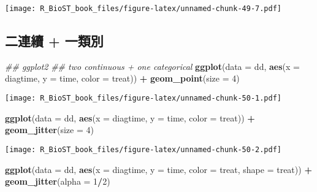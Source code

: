 \documentclass[
]{book}
\newenvironment{Shaded}{\begin{snugshade}}{\end{snugshade}}
\newcommand{\CommentTok}[1]{\textcolor[rgb]{0.56,0.35,0.01}{\textit{#1}}}
\newcommand{\DataTypeTok}[1]{\textcolor[rgb]{0.13,0.29,0.53}{#1}}
\newcommand{\DecValTok}[1]{\textcolor[rgb]{0.00,0.00,0.81}{#1}}
\newcommand{\KeywordTok}[1]{\textcolor[rgb]{0.13,0.29,0.53}{\textbf{#1}}}
\newcommand{\NormalTok}[1]{#1}
\newcommand{\OperatorTok}[1]{\textcolor[rgb]{0.81,0.36,0.00}{\textbf{#1}}}
\newcommand{\StringTok}[1]{\textcolor[rgb]{0.31,0.60,0.02}{#1}}
\begin{document}
\texttt{[image: R\_BioST\_book\_files/figure-latex/unnamed-chunk-49-7.pdf]}

\hypertarget{ux4e8cux9023ux7e8c-ux4e00ux985eux5225}{%
\subsection{二連續 + 一類別}\label{ux4e8cux9023ux7e8c-ux4e00ux985eux5225}}

\begin{Shaded}
\begin{Highlighting}[]
\CommentTok{\#\# ggplot2}
\CommentTok{\#\# two continuous + one categorical}
\KeywordTok{ggplot}\NormalTok{(}\DataTypeTok{data =}\NormalTok{ dd, }\KeywordTok{aes}\NormalTok{(}\DataTypeTok{x =}\NormalTok{ diagtime, }\DataTypeTok{y =}\NormalTok{ time, }\DataTypeTok{color =}\NormalTok{ treat)) }\OperatorTok{+}\StringTok{ }
\StringTok{  }\KeywordTok{geom\_point}\NormalTok{(}\DataTypeTok{size =} \DecValTok{4}\NormalTok{)}
\end{Highlighting}
\end{Shaded}

\texttt{[image: R\_BioST\_book\_files/figure-latex/unnamed-chunk-50-1.pdf]}

\begin{Shaded}
\begin{Highlighting}[]
\KeywordTok{ggplot}\NormalTok{(}\DataTypeTok{data =}\NormalTok{ dd, }\KeywordTok{aes}\NormalTok{(}\DataTypeTok{x =}\NormalTok{ diagtime, }\DataTypeTok{y =}\NormalTok{ time, }\DataTypeTok{color =}\NormalTok{ treat)) }\OperatorTok{+}\StringTok{ }
\StringTok{  }\KeywordTok{geom\_jitter}\NormalTok{(}\DataTypeTok{size =} \DecValTok{4}\NormalTok{)}
\end{Highlighting}
\end{Shaded}

\texttt{[image: R\_BioST\_book\_files/figure-latex/unnamed-chunk-50-2.pdf]}

\begin{Shaded}
\begin{Highlighting}[]
\KeywordTok{ggplot}\NormalTok{(}\DataTypeTok{data =}\NormalTok{ dd, }\KeywordTok{aes}\NormalTok{(}\DataTypeTok{x =}\NormalTok{ diagtime, }\DataTypeTok{y =}\NormalTok{ time, }
                      \DataTypeTok{color =}\NormalTok{ treat, }\DataTypeTok{shape =}\NormalTok{ treat)) }\OperatorTok{+}\StringTok{ }
\StringTok{  }\KeywordTok{geom\_jitter}\NormalTok{(}\DataTypeTok{alpha =} \DecValTok{1}\OperatorTok{/}\DecValTok{2}\NormalTok{) }
\end{Highlighting}
\end{Shaded}
\end{document}
